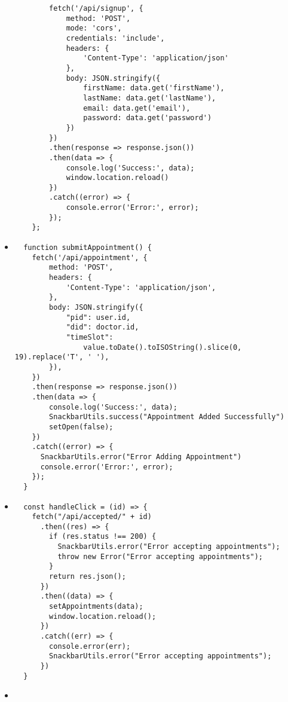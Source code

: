 \begin{itemize}
\begin{verbatim}
        fetch('/api/signup', {
            method: 'POST',
            mode: 'cors',
            credentials: 'include',
            headers: {
                'Content-Type': 'application/json'
            },
            body: JSON.stringify({
                firstName: data.get('firstName'),
                lastName: data.get('lastName'),
                email: data.get('email'),
                password: data.get('password')
            })
        })
        .then(response => response.json())
        .then(data => {
            console.log('Success:', data);
            window.location.reload()
        })
        .catch((error) => {
            console.error('Error:', error);
        });
    };
    \end{verbatim}
    \item
    \begin{verbatim}
  function submitAppointment() {
    fetch('/api/appointment', {
        method: 'POST',
        headers: {
            'Content-Type': 'application/json',
        },
        body: JSON.stringify({
            "pid": user.id,
            "did": doctor.id,
            "timeSlot": 
                value.toDate().toISOString().slice(0, 19).replace('T', ' '),
        }),
    })
    .then(response => response.json())
    .then(data => {
        console.log('Success:', data);
        SnackbarUtils.success("Appointment Added Successfully")
        setOpen(false);
    })
    .catch((error) => {
      SnackbarUtils.error("Error Adding Appointment")
      console.error('Error:', error);
    });
  }
    \end{verbatim}
    \item
    \begin{verbatim}
  const handleClick = (id) => {
    fetch("/api/accepted/" + id)
      .then((res) => {
        if (res.status !== 200) {
          SnackbarUtils.error("Error accepting appointments");
          throw new Error("Error accepting appointments");
        }
        return res.json();
      })
      .then((data) => {
        setAppointments(data);
        window.location.reload();
      })
      .catch((err) => {
        console.error(err);
        SnackbarUtils.error("Error accepting appointments");
      })
  }
    \end{verbatim}
    \item
    \begin{verbatim}

\end{verbatim}
\end{itemize}
